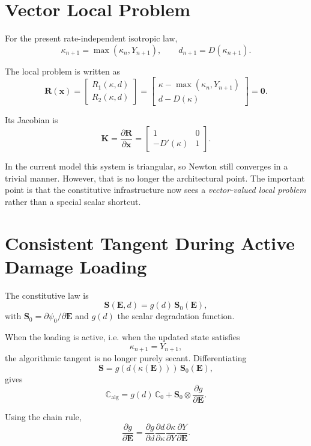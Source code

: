 \section{Vector Local Problem}

For the present rate-independent isotropic law,
\[
  \kappa_{n+1} = \max(\kappa_n, Y_{n+1}),
  \qquad
  d_{n+1} = D(\kappa_{n+1}).
\]

The local problem is written as
\[
  \mathbf{R}(\mathbf{x}) =
  \begin{bmatrix}
    R_1(\kappa,d) \\
    R_2(\kappa,d)
  \end{bmatrix}
  =
  \begin{bmatrix}
    \kappa - \max(\kappa_n, Y_{n+1}) \\
    d - D(\kappa)
  \end{bmatrix}
  = \mathbf{0}.
\]

Its Jacobian is
\[
  \mathbf{K} =
  \frac{\partial \mathbf{R}}{\partial \mathbf{x}}
  =
  \begin{bmatrix}
    1 & 0 \\
    -D'(\kappa) & 1
  \end{bmatrix}.
\]

In the current model this system is triangular, so Newton still converges in a
trivial manner.  However, that is no longer the architectural point.  The
important point is that the constitutive infrastructure now sees a
\emph{vector-valued local problem} rather than a special scalar shortcut.

\section{Consistent Tangent During Active Damage Loading}

The constitutive law is
\[
  \mathbf{S}(\mathbf{E},d) = g(d)\,\mathbf{S}_0(\mathbf{E}),
\]
with $\mathbf{S}_0 = \partial \psi_0 / \partial \mathbf{E}$ and
$g(d)$ the scalar degradation function.

When the loading is active, i.e. when the updated state satisfies
\[
  \kappa_{n+1} = Y_{n+1},
\]
the algorithmic tangent is no longer purely secant.  Differentiating
\[
  \mathbf{S} = g(d(\kappa(\mathbf{E})))\,\mathbf{S}_0(\mathbf{E}),
\]
gives
\[
  \mathbb{C}_{\text{alg}}
  =
  g(d)\,\mathbb{C}_0
  +
  \mathbf{S}_0 \otimes
  \frac{\partial g}{\partial \mathbf{E}}.
\]

Using the chain rule,
\[
  \frac{\partial g}{\partial \mathbf{E}}
  =
  \frac{\partial g}{\partial d}
  \frac{\partial d}{\partial \kappa}
  \frac{\partial \kappa}{\partial Y}
  \frac{\partial Y}{\partial \mathbf{E}}.
\]

